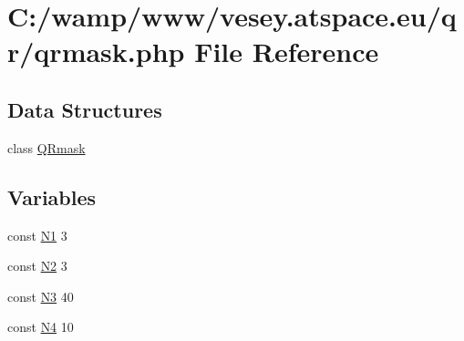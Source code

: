 \hypertarget{qrmask_8php}{\section{C\-:/wamp/www/vesey.atspace.\-eu/qr/qrmask.php File Reference}
\label{qrmask_8php}
}
\subsection*{Data Structures}
\begin{DoxyCompactItemize}
\item 
class \hyperlink{class_q_rmask}{Q\-Rmask}
\end{DoxyCompactItemize}
\subsection*{Variables}
\begin{DoxyCompactItemize}
\item 
const \hyperlink{qrmask_8php_ac1493f26237d5c1f94983ebc237b156f}{N1} 3
\item 
const \hyperlink{qrmask_8php_aefd0c1acafb0b6c3d11e9a73023c5c4b}{N2} 3
\item 
const \hyperlink{qrmask_8php_ac5f0aec2f97594f526ee06937485c95d}{N3} 40
\item 
const \hyperlink{qrmask_8php_a3ce7add5edc7537a8270fe02c20c165d}{N4} 10
\end{DoxyCompactItemize}


